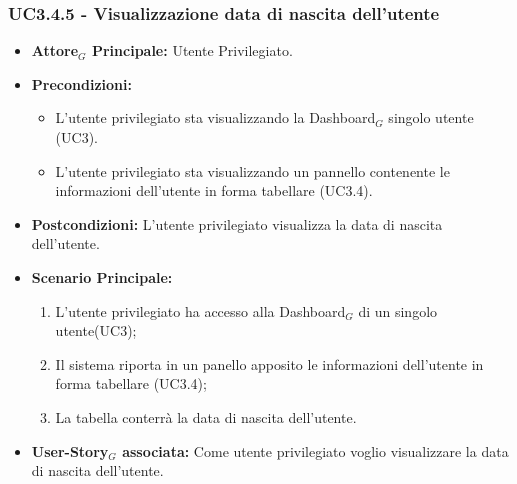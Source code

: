 \documentclass[11pt]{article}
\begin{document}
\begin{justify}
\subsubsection{\textbf{UC3.4.5 - Visualizzazione data di nascita dell'utente}}
\label{UC3.4.5}
\begin{itemize}
     \item \textbf{Attore$_G$ Principale:} Utente Privilegiato.
     \item \textbf{Precondizioni:}
        \begin{itemize}
    	\item L'utente privilegiato sta visualizzando la Dashboard$_G$ singolo utente (UC3).
          \item L'utente privilegiato sta visualizzando un pannello contenente le informazioni dell'utente in forma tabellare (UC3.4).
        \end{itemize}
      \item \textbf{Postcondizioni:} L'utente privilegiato visualizza la data di nascita dell'utente. 
      \item \textbf{Scenario Principale:}
        \begin{enumerate}
            \item L'utente privilegiato ha accesso alla Dashboard$_G$ di un singolo utente(UC3);
            \item Il sistema riporta  in un panello apposito le informazioni dell'utente in forma tabellare (UC3.4);
            \item La tabella conterrà la data di nascita dell'utente.
        \end{enumerate}
     \item \textbf{User-Story$_G$ associata:}
       Come utente privilegiato voglio visualizzare la data di nascita dell'utente.
\end{itemize}


\end{justify}
\end{document}
